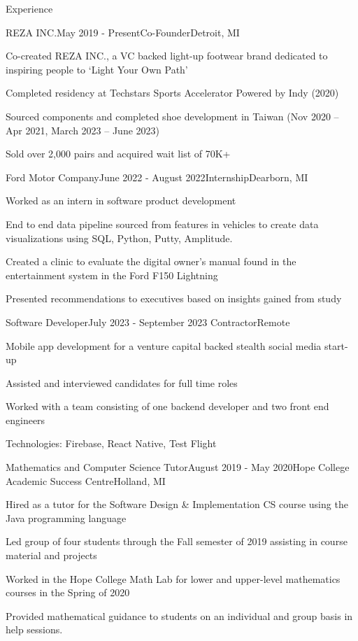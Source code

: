 \documentclass[
	11pt, %
]{resume} %
\begin{document}
\begin{rSection}{Experience}
	\begin{rSubsection}{REZA INC.}{May 2019 - Present}{Co-Founder}{Detroit, MI}
  \item Co-created REZA INC., a VC backed light-up footwear
brand dedicated to inspiring people to ‘Light Your Own
Path’
\item Completed residency at Techstars Sports Accelerator Powered by Indy (2020)\item Sourced components and completed shoe development in Taiwan (Nov 2020 – Apr 2021, March 2023 – June 2023)
\item Sold over 2,000 pairs and acquired wait list of 70K+
	\end{rSubsection}


	\begin{rSubsection}{Ford Motor Company}{June 2022 - August 2022}{Internship}{Dearborn, MI}

  \item Worked as an intern in software product development  
  \item End to end data pipeline sourced from features in vehicles to create data visualizations using SQL, Python, Putty, Amplitude.
  \item  Created a clinic to evaluate the digital owner's manual found in the entertainment system in the Ford F150 Lightning
  \item Presented recommendations to executives based on insights gained from study
	\end{rSubsection}

	\begin{rSubsection}{Software Developer}{July 2023 - September 2023 }{Contractor}{Remote}
  \item Mobile app development for a venture capital backed stealth social media start-up
  \item Assisted and interviewed candidates for full time roles
  \item Worked with a team consisting of one backend developer
and two front end engineers
\item Technologies: Firebase, React Native, Test Flight

	\end{rSubsection}

  \begin{rSubsection}{ Mathematics and Computer Science Tutor}{August 2019 - May 2020}{Hope College Academic Success Centre}{Holland, MI}
    \item Hired as a tutor for the Software Design \& Implementation CS course using the Java programming language
    \item Led group of four students through the Fall semester of 2019 assisting in course material and projects
    \item Worked in the Hope College Math Lab for lower and upper-level mathematics courses in the Spring of 2020
    \item  Provided mathematical guidance to students on an individual and group basis in help sessions.
	\end{rSubsection}


\end{rSection}
\end{document}
